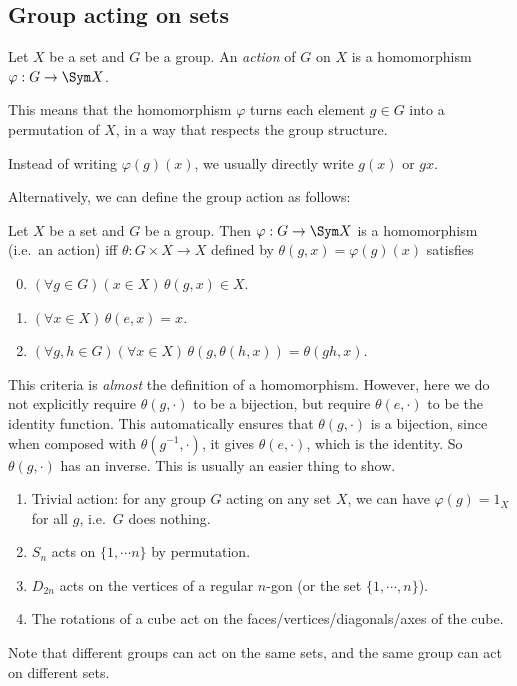 \documentclass[a4paper]{article}
\begin{document}
\subsection{Group acting on sets}
\begin{defi}
  Let $X$ be a set and $G$ be a group. An \emph{action} of $G$ on $X$ is a homomorphism $\varphi: G \to \Sym X$.
\end{defi}
This means that the homomorphism $\varphi$ turns each element $g\in G$ into a permutation of $X$, in a way that respects the group structure.

Instead of writing $\varphi(g)(x)$, we usually directly write $g(x)$ or $gx$.

Alternatively, we can define the group action as follows:
\begin{prop}
  Let $X$ be a set and $G$ be a group. Then $\varphi: G \to \Sym X$ is a homomorphism (i.e.\ an action) iff $\theta: G\times X \to X$ defined by $\theta(g, x) = \varphi(g)(x)$ satisfies
  \begin{enumerate}[label=\arabic{*}.]
      \setcounter{enumi}{-1}
    \item $(\forall g\in G)(x\in X)\,\theta(g, x)\in X$.
    \item $(\forall x\in X)\,\theta(e, x) = x$.
    \item $(\forall g, h\in G)(\forall x\in X)\,\theta(g, \theta (h, x)) = \theta(gh, x)$.
  \end{enumerate}
\end{prop}
This criteria is \emph{almost} the definition of a homomorphism. However, here we do not explicitly require $\theta(g, \cdot)$ to be a bijection, but require $\theta(e, \cdot)$ to be the identity function. This automatically ensures that $\theta(g, \cdot)$ is a bijection, since when composed with $\theta(g^{-1}, \cdot)$, it gives $\theta(e, \cdot)$, which is the identity. So $\theta(g, \cdot)$ has an inverse. This is usually an easier thing to show.

\begin{eg}\leavevmode
  \begin{enumerate}
    \item Trivial action: for any group $G$ acting on any set $X$, we can have $\varphi(g) = 1_X$ for all $g$, i.e.\ $G$ does nothing.
    \item $S_n$ acts on $\{1, \cdots n\}$ by permutation.
    \item $D_{2n}$ acts on the vertices of a regular $n$-gon (or the set $\{1, \cdots, n\}$).
    \item The rotations of a cube act on the faces/vertices/diagonals/axes of the cube.
  \end{enumerate}
\end{eg}
Note that different groups can act on the same sets, and the same group can act on different sets.
\end{document}
